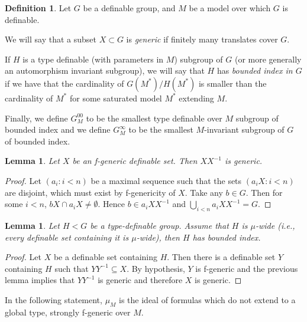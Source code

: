 \documentclass[12pt]{article}
\newtheorem{lemme}[thm]{Lemma}
\theoremstyle{definition}
\newtheorem{defi}[thm]{Definition}
\theoremstyle{mystyle}
\theoremstyle{remark}
\begin{document}
\begin{defi}\label{defG00}
  Let $G$ be a definable group, and $M$ be a model over which $G$ is definable.

  We will say that a subset $X\subset G$ is \emph{generic} if finitely many translates cover $G$.



  If $H$ is a type definable (with parameters in $M$) subgroup of $G$ (or more generally an automorphism invariant subgroup),
  we will say that $H$ has \emph{bounded index in $G$} if
  we have that the cardinality of $G(M^*)/H(M^*)$ is smaller than the cardinality of $M^*$ for some saturated model $M^*$ extending
  $M$.



  Finally, we define $G^{00}_M$ to be the smallest type definable over $M$ subgroup of bounded index and  we define
  $G^{\infty}_M$ to be the smallest $M$-invariant subgroup of $G$ of bounded index.
\end{defi}




\begin{lemme}
Let $X$ be an f-generic definable set. Then $XX^{-1}$ is generic.
\end{lemme}
\begin{proof}
Let $(a_i:i<n)$ be a maximal sequence such that the sets $(a_i X:i<n)$ are disjoint, which must exist by f-genericity of $X$. Take any $b\in G$. Then for some $i<n$, $bX \cap a_i X \neq \emptyset$. Hence $b\in a_i XX^{-1}$ and $\bigcup_{i<n} a_i XX^{-1} = G$.
\end{proof}

\begin{lemme}\label{lem_bddindex}
Let $H<G$ be a type-definable group. Assume that $H$ is $\mu$-wide ({\it i.e.}, every definable set containing it is $\mu$-wide), then $H$ has bounded index.
\end{lemme}
\begin{proof}
Let $X$ be a definable set containing $H$. Then there is a definable set $Y$ containing $H$ such that $YY^{-1} \subseteq X$. By hypothesis, $Y$ is f-generic and the previous lemma implies that $YY^{-1}$ is generic and therefore $X$ is generic.
\end{proof}

In the following statement, $\mu_M$ is the ideal of formulas which do not extend to a global type, strongly f-generic over $M$.
\end{document}
